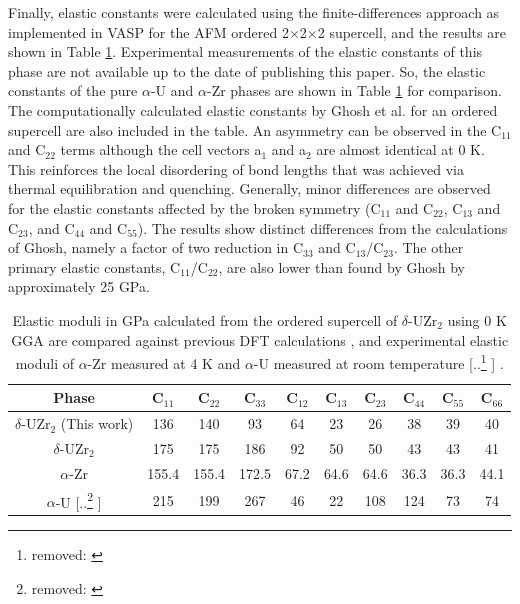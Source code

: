 \documentclass[preprint,12pt]{elsarticle}
\providecommand{\DIFadd}[1]{{\protect\color{blue} \sf #1}} %
\providecommand{\DIFdel}[1]{{\protect\color{red} [..\footnote{removed: #1} ]}} %
\providecommand{\DIFaddFL}[1]{\DIFadd{#1}} %
\providecommand{\DIFdelFL}[1]{\DIFdel{#1}} %
\providecommand{\DIFaddbeginFL}{} %
\providecommand{\DIFaddendFL}{} %
\providecommand{\DIFdelbeginFL}{} %
\providecommand{\DIFdelendFL}{} %
\newcommand{\DIFscaledelfig}{0.5}
\newlength{\DIFdelgraphicswidth} %
\newlength{\DIFdelgraphicsheight} %
\newcommand{\DIFaddincludegraphics}[2][]{{\color{blue}\fbox{\DIFOincludegraphics[#1]{#2}}}} %
\newcommand{\DIFdelincludegraphics}[2][]{%
\sbox{\DIFdelgraphicsbox}{\DIFOincludegraphics[#1]{#2}}%
\settoboxwidth{\DIFdelgraphicswidth}{\DIFdelgraphicsbox} %
\settoboxtotalheight{\DIFdelgraphicsheight}{\DIFdelgraphicsbox} %
\scalebox{\DIFscaledelfig}{%
\parbox[b]{\DIFdelgraphicswidth}{\usebox{\DIFdelgraphicsbox}\\[-\baselineskip] \rule{\DIFdelgraphicswidth}{0em}}\llap{\resizebox{\DIFdelgraphicswidth}{\DIFdelgraphicsheight}{%
\setlength{\unitlength}{\DIFdelgraphicswidth}%
\begin{picture}(1,1)%
\thicklines\linethickness{2pt} %
{\color[rgb]{1,0,0}\put(0,0){\framebox(1,1){}}}%
{\color[rgb]{1,0,0}\put(0,0){\line( 1,1){1}}}%
{\color[rgb]{1,0,0}\put(0,1){\line(1,-1){1}}}%
\end{picture}%
}\hspace*{3pt}}} %
} %
\DeclareRobustCommand{\DIFaddbeginFL}{\DIFOaddbeginFL \let\includegraphics\DIFaddincludegraphics} %
\DeclareRobustCommand{\DIFaddendFL}{\DIFOaddendFL \let\includegraphics\DIFOincludegraphics} %
\DeclareRobustCommand{\DIFdelbeginFL}{\DIFOdelbeginFL \let\includegraphics\DIFdelincludegraphics} %
\DeclareRobustCommand{\DIFdelendFL}{\DIFOaddendFL \let\includegraphics\DIFOincludegraphics} %
\begin{document}
Finally, elastic constants were calculated using the finite-differences approach as implemented in VASP for the AFM ordered 2$\times$2$\times$2 supercell, and the results are shown in Table \ref{tab:elas_const}. Experimental measurements of the elastic constants of this phase are not available up to the date of publishing this paper. So, the elastic constants of the pure $\alpha$-U and $\alpha$-Zr phases are shown in Table \ref{tab:elas_const} for comparison. The computationally calculated elastic constants by Ghosh et al. \cite{ghosh_chemical_2021} for an ordered supercell are also included in the table. An asymmetry can be observed in the C$_{11}$ and C$_{22}$ terms although the cell vectors a$_{1}$ and a$_{2}$ are almost identical at 0 K. This reinforces the local disordering of bond lengths that was achieved via thermal equilibration and quenching. Generally, minor differences are observed for the elastic constants affected by the broken symmetry (C$_{11}$ and C$_{22}$, C$_{13}$ and C$_{23}$, and C$_{44}$ and C$_{55}$). The results show distinct differences from the calculations of Ghosh, namely a factor of two reduction in C$_{33}$ and C$_{13}$/C$_{23}$. The other primary elastic constants, C$_{11}$/C$_{22}$, are also lower than found by Ghosh \cite{ghosh_chemical_2021} by approximately 25 GPa. 

\begin{table}[h!]
    \centering
        \caption{Elastic moduli in GPa calculated from the ordered supercell of $\delta$-UZr$_2$ using 0 K GGA are compared against previous DFT calculations \cite{ghosh_chemical_2021}, and experimental elastic moduli of $\alpha$-Zr measured at 4 K \cite{fisher_single-crystal_1964} and $\alpha$-U measured at room temperature \DIFdelbeginFL \DIFdelFL{\cite{fisher_adiabatic_1958}}\DIFdelendFL \DIFaddbeginFL \DIFaddFL{\cite{fisher1958adiabatic}}\DIFaddendFL .}
    \label{tab:elas_const}
    \begin{tabular}{|c|c|c|c|c|c|c|c|c|c|}
    \hline
Phase & C$_{11}$ & C$_{22}$ & C$_{33}$  & C$_{12}$ & C$_{13}$ & C$_{23}$ & C$_{44}$ & C$_{55}$ & C$_{66}$   \\
 \hline
   $\delta$-UZr$_2$ (This work) &136& 140 & 93 & 64 & 23 &26 & 38 & 39 & 40 \\
   \hline
     $\delta$-UZr$_2$ \cite{ghosh_chemical_2021} &175& 175 & 186 & 92 & 50 &50 & 43 & 43 & 41 \\
   \hline
   $\alpha$-Zr  \cite{fisher_single-crystal_1964} & 155.4 &155.4 &172.5 &67.2 &64.6 &64.6 &36.3 &36.3 &44.1 \\
   \hline
    $\alpha$-U \DIFdelbeginFL \DIFdelFL{\cite{fisher_adiabatic_1958} }\DIFdelendFL \DIFaddbeginFL \DIFaddFL{\cite{fisher1958adiabatic} }\DIFaddendFL & 215&199 &267 &46 &22 &108 & 124& 73&74\\
     \hline
    \end{tabular}
\end{table}
\end{document}
